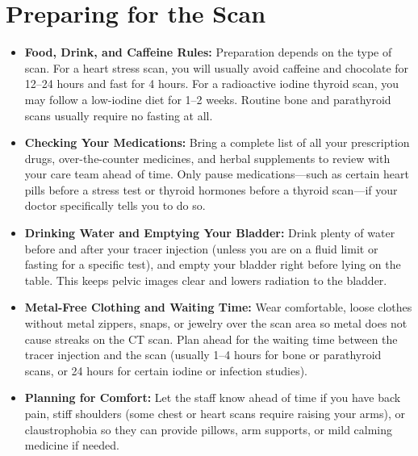 \section{Preparing for the Scan}
\begin{itemize}
    \item \textbf{Food, Drink, and Caffeine Rules:} Preparation depends on the type of scan. For a heart stress scan, you will usually avoid caffeine and chocolate for 12--24 hours and fast for 4 hours. For a radioactive iodine thyroid scan, you may follow a low-iodine diet for 1--2 weeks. Routine bone and parathyroid scans usually require no fasting at all.
    \item \textbf{Checking Your Medications:} Bring a complete list of all your prescription drugs, over-the-counter medicines, and herbal supplements to review with your care team ahead of time. Only pause medications---such as certain heart pills before a stress test or thyroid hormones before a thyroid scan---if your doctor specifically tells you to do so.
    \item \textbf{Drinking Water and Emptying Your Bladder:} Drink plenty of water before and after your tracer injection (unless you are on a fluid limit or fasting for a specific test), and empty your bladder right before lying on the table. This keeps pelvic images clear and lowers radiation to the bladder.
    \item \textbf{Metal-Free Clothing and Waiting Time:} Wear comfortable, loose clothes without metal zippers, snaps, or jewelry over the scan area so metal does not cause streaks on the CT scan. Plan ahead for the waiting time between the tracer injection and the scan (usually 1--4 hours for bone or parathyroid scans, or 24 hours for certain iodine or infection studies).
    \item \textbf{Planning for Comfort:} Let the staff know ahead of time if you have back pain, stiff shoulders (some chest or heart scans require raising your arms), or claustrophobia so they can provide pillows, arm supports, or mild calming medicine if needed.
\end{itemize}

